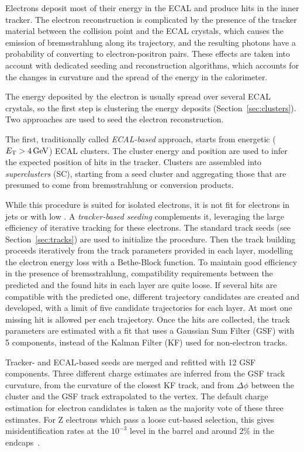 \label{sec:eleReco}
Electrons deposit most of their energy in the ECAL and produce hits in the inner tracker.
The electron reconstruction is complicated by the presence of the tracker material between the collision point and the ECAL crystals,
which causes the emission of bremsstrahlung along its trajectory, and the resulting photons have a probability of converting to electron-positron pairs.
These effects are taken into account with dedicated seeding and reconstruction algorithms,
which accounts for the changes in curvature and the spread of the energy in the calorimeter.

The energy deposited by the electron is usually spread over several ECAL crystals, so the first step is clustering the energy deposits (Section~\ref{sec:clusters}).
Two approaches are used to seed the electron reconstruction.

The first, traditionally called \textit{ECAL-based} approach, starts from energetic ($E_{\mathrm{T}} > 4\,\text{Ge\hspace{-.08em}V}$) ECAL clusters.
The cluster energy and position are used to infer the expected position of hits in the tracker.
Clusters are assembled into \textit{superclusters} (SC),
starting from a seed cluster and aggregating those that are presumed to come from bremsstrahlung or conversion products.

While this procedure is suited for isolated electrons, it is not fit for electrons in jets or with low \pt.
A \textit{tracker-based seeding} complements it, leveraging the large efficiency of iterative tracking for these electrons.
The standard track seeds (see Section~\ref{sec:tracks}) are used to initialize the procedure.
Then the track building proceeds iteratively from the track parameters provided in each layer, modelling the electron energy loss with a Bethe-Block function.
To maintain good efficiency in the presence of bremsstrahlung, compatibility requirements between the predicted and the found hits in each layer are quite loose.
If several hits are compatible with the predicted one, different trajectory candidates are created and developed,
with a limit of five candidate trajectories for each layer.
At most one missing hit is allowed per each trajectory.
Once the hits are collected, the track parameters are estimated with a fit that uses a Gaussian Sum Filter (GSF) \cite{CMS-NOTE-2005-001} with 5 components,
instead of the Kalman Filter (KF) \cite{billoir.qian:simultaneous} used for non-electron tracks.

Tracker- and ECAL-based seeds are merged and refitted with 12 GSF components.
Three different charge estimates are inferred from the GSF track curvature,
from the curvature of the closest KF track, and from $\Delta\phi$ between the cluster and the GSF track extrapolated to the vertex.
The default charge estimation for electron candidates is taken as the majority vote of these three estimates.
For Z electrons which pass a loose cut-based selection, this gives misidentification rates at the $10^{-3}$ level in the barrel
and around 2\usep\% in the endcaps~\cite{Rembser_2019}.
